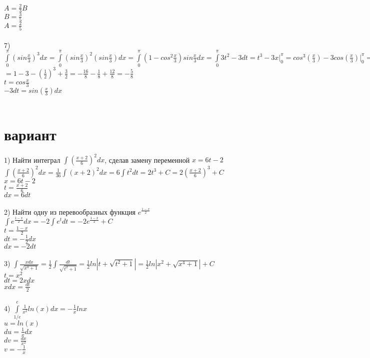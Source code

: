 \documentclass[a4paper]{article}
\begin{document}
    $A=\frac{2}{3}B$\\
    $B=\frac{3}{5}$\\
    $A=\frac{2}{5}$\\\\
    7)$\int\limits_0^\pi (sin\frac{x}{3})^3 dx
    =\int\limits_0^\pi (sin\frac{x}{3})^2(sin\frac{x}{3}) dx
    =\int\limits_0^\pi(1-cos^2\frac{x}{3})sin\frac{x}{3}dx
    =\int\limits_0^\pi 3t^2-3dt
    =t^3-3x \bigg|_0^\pi
    =cos^3(\frac{x}{3})-3cos(\frac{x}{3}) \bigg|_0^\pi=$\\
    $=1-3-(\frac{1}{2})^3+\frac{3}{2}
    =-\frac{16}{8}-\frac{1}{8}+\frac{12}{8}
    =-\frac{5}{8}$\\
    $t=cos\frac{x}{3}$\\
    $-3dt=sin(\frac{x}{3})dx$\\\\
    \section{вариант}
    1) Найти интеграл $\int (\frac{x+2}{6})^2dx$, сделав замену переменной $x=6t-2$\\
    $\int (\frac{x+2}{6})^2dx
    =\frac{1}{36}\int (x+2)^2dx
    =6\int t^2dt
    =2t^3+C
    =2(\frac{x+2}{6})^3+C$\\
    $x=6t-2$\\
    $t=\frac{x+2}{6}$\\
    $dx=6dt$\\\\
    2) Найти одну из перевообразных функция $e^{\frac{1-x}{2}}$\\
    $\int e^{\frac{1-x}{2}}dx
    =-2\int e^t dt
    =-2e^\frac{1-x}{2}+C$\\
    $t=\frac{1-x}{2}$\\
    $dt=-\frac{1}{2}dx$\\
    $dx=-2dt$\\\\
    3)
    $\int \frac{xdx}{\sqrt{x^4+1}}
    =\frac{1}{2}\int \frac{dt}{\sqrt{t^2+1}}
    =\frac{1}{2} ln|t+\sqrt{t^2+1}|
    =\frac{1}{2} ln|x^2+\sqrt{x^4+1}|+C$\\
    $t=x^2$\\
    $dt=2xdx$\\
    $xdx=\frac{dt}{2}$\\\\
    4)
    $\int\limits_{1/e}^e \frac{1}{x^2}ln(x)dx
    =-\frac{1}{x}lnx$\\
    $u=ln(x)$\\
    $du=\frac{1}{x}dx$\\
    $dv=\frac{dx}{x^2}$\\
    $v=-\frac{1}{x}$\\
\end{document}
